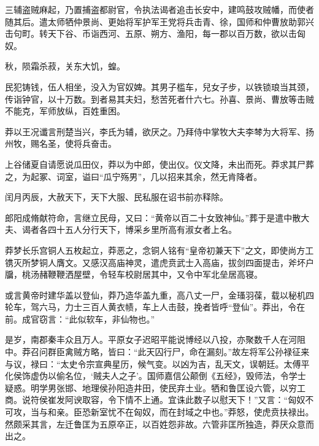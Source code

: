 \documentclass[12pt,UTF8]{ctexbook}
\begin{document}
三辅盗贼麻起，乃置捕盗都尉官，令执法谒者追击长安中，建鸣鼓攻贼幡，而使者随其后。遣太师牺仲景尚、更始将军护军王党将兵击青、徐，国师和仲曹放助郭兴击句町。转天下谷、币诣西河、五原、朔方、渔阳，每一郡以百万数，欲以击匈奴。



秋，陨霜杀菽，关东大饥，蝗。



民犯铸钱，伍人相坐，没入为官奴婢。其男子槛车，兒女子步，以铁锁琅当其颈，传诣钟官，以十万数。到者易其夫妇，愁苦死者什六七。孙喜、景尚、曹放等击贼不能克，军师放纵，百姓重困。



莽以王况谶言刑楚当兴，李氏为辅，欲厌之。乃拜侍中掌牧大夫李棽为大将军、扬州牧，赐名圣，使将兵奋击。



上谷储夏自请愿说瓜田仪，莽以为中郎，使出仪。仪文降，未出而死。莽求其尸葬之，为起冢、词室，谥曰“瓜宁殇男”，几以招来其余，然无肯降者。



闰月丙辰，大赦天下，天下大服、民私服在诏书前亦释除。



郎阳成脩献符命，言继立民母，又曰：“黄帝以百二十女致神仙。”葬于是遣中散大夫、谒者各四十五人分行天下，博采乡里所高有淑女者上名。



莽梦长乐宫铜人五枚起立，莽恶之，念铜人铭有“皇帝初兼天下”之文，即使尚方工镌灭所梦铜人膺文。又感汉高庙神灵，遣虎贲武士入高庙，拔剑四面提击，斧坏户牖，桃汤赭鞭鞭洒屋壁，令轻车校尉居其中，又令中军北垒居高寝。



或言黄帝时建华盖以登仙，莽乃造华盖九重，高八丈一尸，金瑵羽葆，载以秘机四轮车，驾六马，力士三百人黄衣帻，车上人击鼓，挽者皆呼“登仙”。莽出，令在前。成官窃言：“此似软车，非仙物也。”



是岁，南郡秦丰众且万人。平原女子迟昭平能说博经以八投，亦聚数千人在河阻中。莽召问群臣禽贼方略，皆曰：“此天囚行尸，命在漏刻。”故左将军公孙禄征来与议，禄曰：“太史令宗宣典星历，候气变。以凶为吉，乱天文，误朝廷。太傅平化侯饰虚伪以偷名位，‘贼夫人之子’。国师嘉信公颠倒《五经》，毁师法，令学士疑惑。明学男张邯、地理侯孙阳造井田，使民弃土业。牺和鲁匡设六管，以穷工商。说符侯崔发阿谀取容，令下情不上通。宜诛此数子以慰天下！”又言：“匈奴不可攻，当与和亲。臣恐新室忧不在匈奴，而在封域之中也。”莽怒，使虎贲扶禄出。然颇采其言，左迁鲁匡为五原卒正，以百姓怨非故。六管非匡所独造，莽厌众意而出之。
\end{document}
